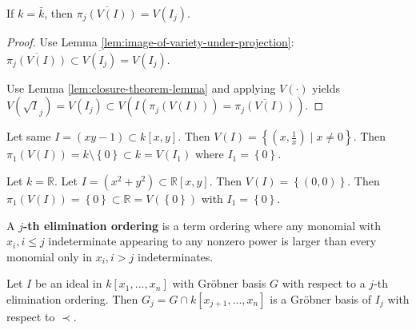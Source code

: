 \begin{mdframed}
\begin{thm}
If \( k = \bar k \), then \(\overline{\pi_j(V(I))} =  V(I_j)  \).
\end{thm}
\end{mdframed}

\begin{proof}
  Use Lemma \ref{lem:image-of-variety-under-projection}: \( \overline{\pi_j(V(I))} \subset \overline{V(I_j)} = V(I_j) \).

  Use Lemma \ref{lem:closure-theorem-lemma} and applying \( V(\cdot) \) yields \( V(\sqrt I_j) = V(I_j)  \subset V(I(\pi_j(V(I))) = \overline{\pi_j(V(I))}) \).
\end{proof}


\begin{eg}
Let same \( I = (xy - 1) \subset k[x,y] \). Then \( V(I) = \left\{ (x,\frac{1}{x}) \mid x \neq 0 \right\} \). Then \( \pi_1(V(I)) = k \setminus \left\{ 0 \right\} \subset k = V(I_1) \) where \( I_1 = \left\{ 0 \right\} \).
\end{eg}

\begin{eg}
Let \( k = \mathbb{R} \). Let \( I = (x^2 + y^2) \subset \mathbb R [x,y]\). Then \( V(I) = \left\{ (0,0) \right\} \). Then \( \pi_1(V(I)) = \left\{ 0 \right\} \subset \mathbb R = V(\left\{ 0 \right\}) \) with \( I_1 = \left\{ 0 \right\} \).
\end{eg}



\begin{defi}
  A \textbf{$j$-th elimination ordering} is a term ordering where any monomial with \( x_i, i \leq j \) indeterminate appearing to any nonzero power is larger than every monomial only in \( x_i, i > j \) indeterminates.
\end{defi}

\begin{mdframed}
\begin{thm}\label{thm:elimination-theorem}
Let \( I \) be an ideal in \( k[x_1, ..., x_n] \) with Gröbner basis \( G \) with respect to a \( j \)-th elimination ordering. Then \( G_j = G \cap k[x_{j+1}, ... , x_n] \) is a Gröbner basis of \( I_j \) with respect to \( \prec \).
\end{thm}
\end{mdframed}

